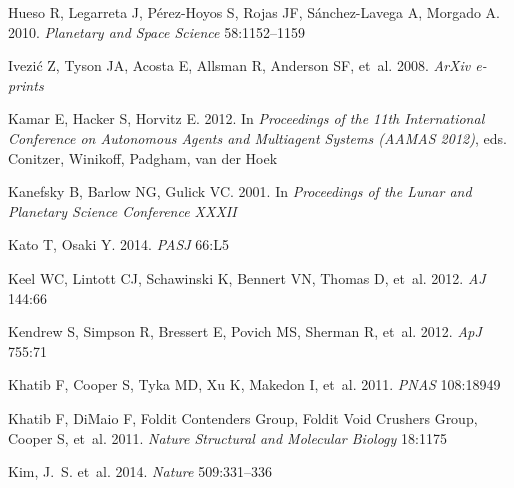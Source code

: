 \documentclass{ar2e}
\def\apj{ApJ}
\def\aj{AJ}
\def\pasj{PASJ}
\def\nat{Nature}
\begin{document}
\begin{thebibliography}{}
{Hueso} R, {Legarreta} J, {P{\'e}rez-Hoyos} S, {Rojas} JF, {S{\'a}nchez-Lavega}
  A, {Morgado} A. 2010.
\newblock \textit{Planetary and Space Science} 58:1152--1159

{Ivezi{\'c}} Z, {Tyson} JA, {Acosta} E, {Allsman} R, {Anderson} SF, et~al. 2008.
\newblock \textit{ArXiv e-prints}

{Kamar} E, {Hacker} S, {Horvitz} E. 2012.
\newblock In \textit{Proceedings of the 11th International Conference on
  Autonomous Agents and Multiagent Systems (AAMAS 2012)}, eds. {Conitzer},
  {Winikoff}, {Padgham}, {van der Hoek}

{Kanefsky} B, {Barlow} NG, {Gulick} VC. 2001.
\newblock In \textit{Proceedings of the Lunar and Planetary Science Conference
  XXXII}

{Kato} T, {Osaki} Y. 2014.
\newblock \textit{\pasj} 66:L5

{Keel} WC, {Lintott} CJ, {Schawinski} K, {Bennert} VN, {Thomas} D, et~al. 2012.
\newblock \textit{\aj} 144:66

{Kendrew} S, {Simpson} R, {Bressert} E, {Povich} MS, {Sherman} R, et~al. 2012.
\newblock \textit{\apj} 755:71

{Khatib} F, {Cooper} S, {Tyka} MD, {Xu} K, {Makedon} I, et~al.
  2011{}.
\newblock \textit{{PNAS}} 108:18949

{Khatib} F, {DiMaio} F, {Foldit Contenders Group}, {Foldit Void Crushers
  Group}, {Cooper} S, et~al. 2011{}.
\newblock \textit{{Nature Structural and Molecular Biology}} 18:1175

{Kim}, J.~S. et~al. 2014.
\newblock \textit{\nat} 509:331--336


\end{thebibliography}
\end{document}
